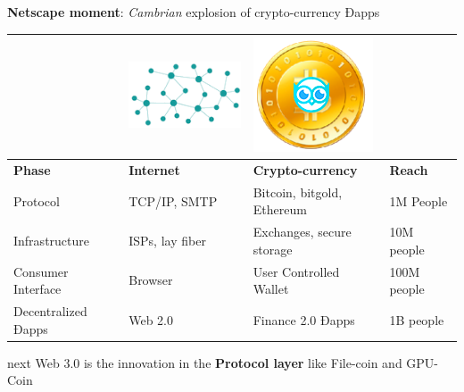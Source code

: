 \textbf{Netscape moment}: \emph{Cambrian} explosion of crypto-currency Ðapps
 
\centering

 \begin{adjustbox}{width=1\textwidth}
\begin{tabularx} {\textwidth}{|X|X|X|X|}
    \hline
&    \includegraphics[scale=0.3]{static/decentnew} &     \includegraphics[scale=0.3]{static/hootcoin} & \\
    \hline
\textbf{Phase} & \textbf{Internet} & \textbf{Crypto-currency} & \textbf{Reach}\\
\hline
Protocol & TCP/IP, SMTP & Bitcoin, bitgold, Ethereum & 1M People \\
\hline
Infrastructure & ISPs, lay fiber & Exchanges, secure storage & 10M people \\
\hline
Consumer Interface & Browser & User Controlled Wallet & 100M people \\
\hline
Decentralized Ðapps &  Web 2.0  & Finance 2.0 Ðapps & 1B people\\
\hline
\end{tabularx}
\end{adjustbox}

next Web 3.0 is the innovation in the \textbf{Protocol layer} like File-coin and GPU-Coin